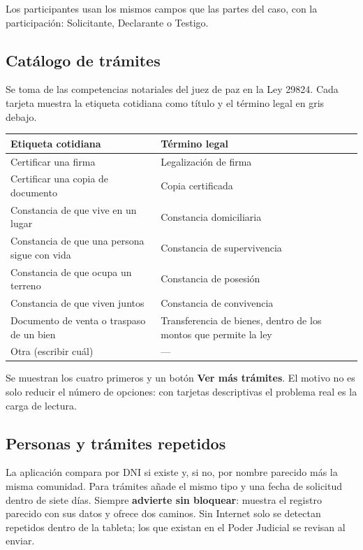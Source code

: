 \documentclass[11pt,a4paper]{article}
\begin{document}
Los participantes usan los mismos campos que las partes del caso, con la participación: Solicitante, Declarante o Testigo.

\subsection{Catálogo de trámites}

Se toma de las competencias notariales del juez de paz en la Ley 29824. Cada tarjeta muestra la etiqueta cotidiana como título y el término legal en gris debajo.

\begin{center}
\small
\begin{tabular}{@{}p{7.6cm}p{7.2cm}@{}}
\toprule
\textbf{Etiqueta cotidiana} & \textbf{Término legal} \\
\midrule
Certificar una firma & Legalización de firma \\
Certificar una copia de documento & Copia certificada \\
Constancia de que vive en un lugar & Constancia domiciliaria \\
Constancia de que una persona sigue con vida & Constancia de supervivencia \\
Constancia de que ocupa un terreno & Constancia de posesión \\
Constancia de que viven juntos & Constancia de convivencia \\
Documento de venta o traspaso de un bien & Transferencia de bienes, dentro de los montos que permite la ley \\
Otra (escribir cuál) & --- \\
\bottomrule
\end{tabular}
\end{center}

Se muestran los cuatro primeros y un botón \textbf{Ver más trámites}. El motivo no es solo reducir el número de opciones: con tarjetas descriptivas el problema real es la carga de lectura.

\subsection{Personas y trámites repetidos}

La aplicación compara por DNI si existe y, si no, por nombre parecido más la misma comunidad. Para trámites añade el mismo tipo y una fecha de solicitud dentro de siete días. Siempre \textbf{advierte sin bloquear}: muestra el registro parecido con sus datos y ofrece dos caminos. Sin Internet solo se detectan repetidos dentro de la tableta; los que existan en el Poder Judicial se revisan al enviar.
\end{document}
